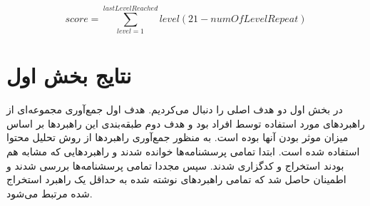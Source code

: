 \documentclass[twoside, a4paper,11pt]{book}
\numberwithin{equation}{chapter}
\numberwithin{table}{chapter}
\numberwithin{figure}{chapter}
\numberwithin{equation}{chapter}
\begin{document}
\begin{equation}
\label{eq:levelScore}
	score = \sum_{level=1}^{lastLevelReached} level(21-numOfLevelRepeat)
\end{equation}


\section{نتایج بخش اول}
در بخش اول دو هدف اصلی را دنبال می‌کردیم. هدف اول جمع‌آوری مجموعه‌ای از راهبرد‌های مورد استفاده توسط افراد بود و هدف دوم طبقه‌بندی این راهبرد‌ها بر اساس میزان موثر بودن آنها بوده است. به منظور جمع‌آوری راهبردها از روش تحلیل محتوا استفاده شده است.  ابتدا تمامی پرسشنامه‌ها خوانده شدند و راهبردهایی که مشابه هم بودند استخراج و کدگزاری شدند. سپس مجددا تمامی پرسشنامه‌ها بررسی شدند و اطمینان حاصل شد که تمامی راهبرد‌های نوشته شده به حداقل یک راهبرد استخراج شده مرتبط می‌شود.
\end{document}
